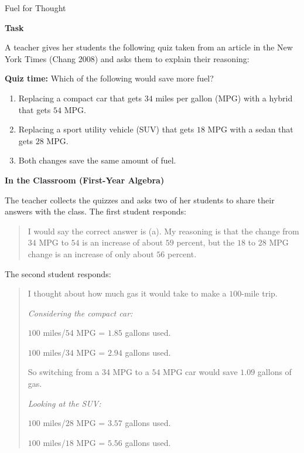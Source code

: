 \TriExample
  {Fuel for Thought}
  {
    \textbf{Task}

    A teacher gives her students the following quiz taken from an article in the New York Times (Chang 2008) and asks them to explain their reasoning:

    \textbf{Quiz time:} Which of the following would save more fuel?

    \begin{enumerate}
      \item [(a)] Replacing a compact car that gets $34$ miles per gallon (MPG) with a hybrid that gets $54$ MPG.

      \item [(b)] Replacing a sport utility vehicle (SUV) that gets $18$ MPG with a sedan that gets $28$ MPG.\vspace{\baselineskip}

      \item [(c)] Both changes save the same amount of fuel.
    \end{enumerate}

    \textbf{In the Classroom (First-Year Algebra)}

    The teacher collects the quizzes and asks two of her students to share their answers with the class. The first student responds:

    \begin{quote}
      I would say the correct answer is (a). My reasoning is that the change from $34$ MPG to $54$ is an increase of about $59$ percent, but the $18$ to $28$ MPG change is an increase of only about $56$ percent.
    \end{quote}

    The second student responds:

    \begin{quote}
      I thought about how much gas it would take to make a $100$-mile trip.

      \emph{Considering the compact car:}

      $100$ miles/$5$4 MPG = $1.85$ gallons used.

      $100$ miles/$34$ MPG = $2.94$ gallons used.

      So switching from a $3$4 MPG to a $54$ MPG car would save $1.09$ gallons of gas.

      \emph{Looking at the SUV:}

      $100$ miles/$28$ MPG = $3.57$ gallons used.

      $100$ miles/$18$ MPG = $5.56$ gallons used.


\end{quote}}
